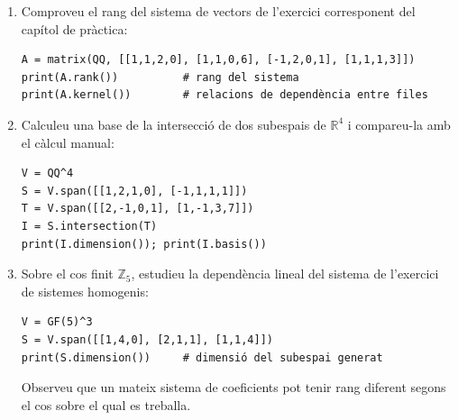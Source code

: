 \begin{enumerate}
\item Comproveu el rang del sistema de vectors de l'exercici corresponent
del capítol de pràctica:
\begin{verbatim}
A = matrix(QQ, [[1,1,2,0], [1,1,0,6], [-1,2,0,1], [1,1,1,3]])
print(A.rank())          # rang del sistema
print(A.kernel())        # relacions de dependència entre files
\end{verbatim}

\item Calculeu una base de la intersecció de dos subespais de
$\mathbb{R}^{4}$ i compareu-la amb el càlcul manual:
\begin{verbatim}
V = QQ^4
S = V.span([[1,2,1,0], [-1,1,1,1]])
T = V.span([[2,-1,0,1], [1,-1,3,7]])
I = S.intersection(T)
print(I.dimension()); print(I.basis())
\end{verbatim}

\item Sobre el cos finit $\mathbb{Z}_{5}$, estudieu la dependència lineal
del sistema de l'exercici de sistemes homogenis:
\begin{verbatim}
V = GF(5)^3
S = V.span([[1,4,0], [2,1,1], [1,1,4]])
print(S.dimension())     # dimensió del subespai generat
\end{verbatim}
Observeu que un mateix sistema de coeficients pot tenir rang diferent
segons el cos sobre el qual es treballa.
\end{enumerate}